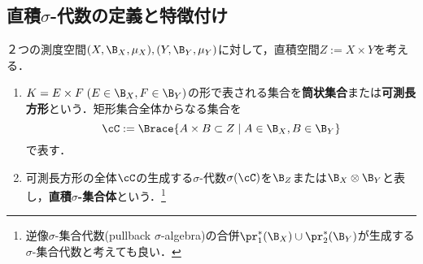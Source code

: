 \documentclass[uplatex, dvipdfmx]{jsreport}
\begin{document}
\subsection{直積$\sigma$-代数の定義と特徴付け}

\begin{definition}
    ２つの測度空間$(X,\B_X,\mu_X),(Y,\B_Y,\mu_Y)$に対して，直積空間$Z:=X\times Y$を考える．
    \begin{enumerate}
        \item $K=E\times F\;(E\in\B_X,F\in\B_Y)$の形で表される集合を\textbf{筒状集合}または\textbf{可測長方形}という．矩形集合全体からなる集合を\[\cC:=\Brace{A\times B\subset Z\mid A\in\B_X,B\in\B_Y}\]で表す．
        \item 可測長方形の全体$\cC$の生成する$\sigma$-代数$\sigma(\cC)$を$\B_Z$または$\B_X\otimes\B_Y$と表し，\textbf{直積$\sigma$-集合体}という．\footnote{逆像$\sigma$-集合代数(pullback $\sigma$-algebra)の合併$\pr_1^*(\B_X)\cup\pr_2^*(\B_Y)$が生成する$\sigma$-集合代数と考えても良い．}
    \end{enumerate}
\end{definition}
\end{document}

